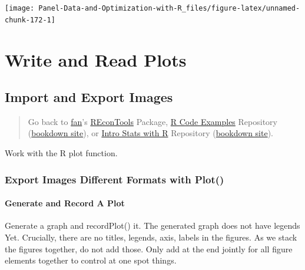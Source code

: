 \documentclass[
]{book}
\begin{document}
\begin{center}\texttt{[image: Panel-Data-and-Optimization-with-R\_files/figure-latex/unnamed-chunk-172-1]} \end{center}

\hypertarget{write-and-read-plots}{%
\section{Write and Read Plots}\label{write-and-read-plots}}

\hypertarget{import-and-export-images}{%
\subsection{Import and Export Images}\label{import-and-export-images}}

\begin{quote}
Go back to \href{http://fanwangecon.github.io/}{fan}'s \href{https://fanwangecon.github.io/REconTools/}{REconTools} Package, \href{https://fanwangecon.github.io/R4Econ/}{R Code Examples} Repository (\href{https://fanwangecon.github.io/R4Econ/bookdown}{bookdown site}), or \href{https://fanwangecon.github.io/Stat4Econ/}{Intro Stats with R} Repository (\href{https://fanwangecon.github.io/Stat4Econ/bookdown}{bookdown site}).
\end{quote}

Work with the R plot function.

\hypertarget{export-images-different-formats-with-plot}{%
\subsubsection{Export Images Different Formats with Plot()}\label{export-images-different-formats-with-plot}}

\hypertarget{generate-and-record-a-plot}{%
\paragraph{Generate and Record A Plot}\label{generate-and-record-a-plot}}

Generate a graph and recordPlot() it. The generated graph does not have legends Yet. Crucially, there are no titles, legends, axis, labels in the figures. As we stack the figures together, do not add those. Only add at the end jointly for all figure elements together to control at one spot things.
\end{document}
